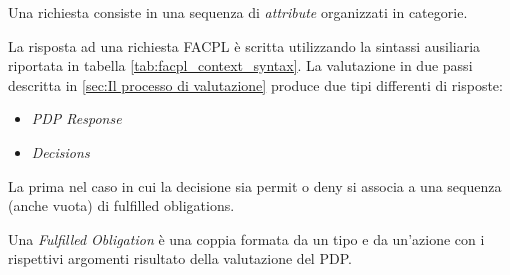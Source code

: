 Una richiesta consiste in una sequenza di \emph{attribute} organizzati in categorie.\par
La risposta ad una richiesta FACPL è scritta utilizzando la sintassi ausiliaria riportata in tabella \ref{tab:facpl_context_syntax}.
La valutazione in due passi descritta in \ref{sec:Il processo di valutazione} produce due tipi differenti di risposte:
\begin{itemize}
  \item \emph{PDP Response}
  \item \emph{Decisions}
\end{itemize}
La prima nel caso in cui la decisione sia permit o deny si associa a una sequenza (anche vuota) di fulfilled obligations.\par
Una \emph{Fulfilled Obligation} è una coppia formata da un tipo e da un'azione con i rispettivi argomenti risultato della
valutazione del PDP.


